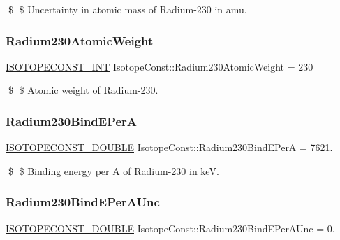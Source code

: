 \$ \$ Uncertainty in atomic mass of Radium-\/230 in amu. \mbox{\label{group___isotope_const-_radium-_ra230_gabf6cea6479150dc37717c2d207b83ef4}} 
\subsubsection{\texorpdfstring{Radium230\+Atomic\+Weight}{Radium230AtomicWeight}}
{\footnotesize\ttfamily \mbox{\hyperlink{group___isotope_const-_macros_ga5f18360b3e99483a35c32d789e62621c}{I\+S\+O\+T\+O\+P\+E\+C\+O\+N\+S\+T\+\_\+\+I\+NT}} Isotope\+Const\+::\+Radium230\+Atomic\+Weight = 230}

\$ \$ Atomic weight of Radium-\/230. \mbox{\label{group___isotope_const-_radium-_ra230_gafb0467b2f66e071cc6f654393f362765}} 
\subsubsection{\texorpdfstring{Radium230\+Bind\+E\+PerA}{Radium230BindEPerA}}
{\footnotesize\ttfamily \mbox{\hyperlink{group___isotope_const-_macros_ga8f45a7272ce02c0b4c65c44636ed719a}{I\+S\+O\+T\+O\+P\+E\+C\+O\+N\+S\+T\+\_\+\+D\+O\+U\+B\+LE}} Isotope\+Const\+::\+Radium230\+Bind\+E\+PerA = 7621.}

\$ \$ Binding energy per A of Radium-\/230 in keV. \mbox{\label{group___isotope_const-_radium-_ra230_gace66cd9dc3aa44e28b2601a56e5749ad}} 
\subsubsection{\texorpdfstring{Radium230\+Bind\+E\+Per\+A\+Unc}{Radium230BindEPerAUnc}}
{\footnotesize\ttfamily \mbox{\hyperlink{group___isotope_const-_macros_ga8f45a7272ce02c0b4c65c44636ed719a}{I\+S\+O\+T\+O\+P\+E\+C\+O\+N\+S\+T\+\_\+\+D\+O\+U\+B\+LE}} Isotope\+Const\+::\+Radium230\+Bind\+E\+Per\+A\+Unc = 0.}

